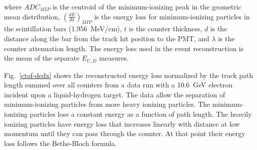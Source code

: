 \documentclass{elsart}
\begin{document}
\noindent
where $ADC_{MIP}$ is the centroid of the minimum-ionizing peak in the geometric mean distribution,
$\left( \frac{dE}{dx} \right)_{MIP}$ is the energy loss for minimum-ionizing particles in the scintillation
bars (1.956~MeV/cm), $t$ is the counter thickness, $d$ is the distance along the bar from the track hit
position to the PMT, and $\lambda$ is the counter attenuation length. The energy loss used in the event
reconstruction is the mean of the separate $E_{U,D}$ measures.

Fig.~\ref{ctof-dedx} shows the reconstructed energy loss normalized by the track path length summed
over all counters from a data run with a 10.6~GeV electron incident upon a liquid-hydrogen target. The
data allow the separation of minimum-ionizing particles from more heavy ionizing particles. The
minimum-ionizing particles lose a constant energy as a function of path length. The heavily ionizing particles
have energy loss that increases linearly with distance at low momentum until they can pass through the
counter. At that point their energy loss follows the Bethe-Bloch formula.
\end{document}
